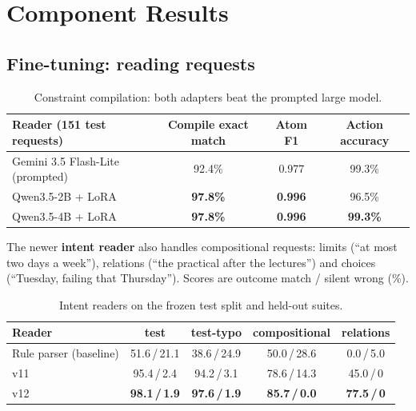 \documentclass[11pt,a4paper]{article}
\newcommand{\best}[1]{\textbf{#1}}
\begin{document}
\section{Component Results}
\subsection{Fine-tuning: reading requests}
\begin{table}[H]
\centering\small
\begin{tabularx}{\textwidth}{@{}l C C C@{}}
\toprule
\textbf{Reader (151 test requests)} & \textbf{Compile exact match} & \textbf{Atom F1} & \textbf{Action accuracy}\\
\midrule
Gemini 3.5 Flash-Lite (prompted) & 92.4\% & 0.977 & 99.3\%\\
Qwen3.5-2B + LoRA & \best{97.8\%} & \best{0.996} & 96.5\%\\
Qwen3.5-4B + LoRA & \best{97.8\%} & \best{0.996} & \best{99.3\%}\\
\bottomrule
\end{tabularx}
\caption{Constraint compilation: both adapters beat the prompted large model.}
\label{tab:parse}
\end{table}

\noindent The newer \textbf{intent reader} also handles compositional requests: limits
(``at most two days a week''), relations (``the practical after the lectures'') and
choices (``Tuesday, failing that Thursday''). Scores are outcome match / silent wrong (\%).
\begin{table}[H]
\centering\small
\begin{tabular*}{\textwidth}{@{\extracolsep{\fill}}lcccc@{}}
\toprule
\textbf{Reader} & \textbf{test} & \textbf{test-typo} & \textbf{compositional} & \textbf{relations}\\
\midrule
Rule parser (baseline) & 51.6\,/\,21.1 & 38.6\,/\,24.9 & 50.0\,/\,28.6 & 0.0\,/\,5.0\\
v11 & 95.4\,/\,2.4 & 94.2\,/\,3.1 & 78.6\,/\,14.3 & 45.0\,/\,0\\
v12 & \best{98.1\,/\,1.9} & \best{97.6\,/\,1.9} & \best{85.7\,/\,0.0} & \best{77.5\,/\,0}\\
\bottomrule
\end{tabular*}
\caption{Intent readers on the frozen test split and held-out suites.}
\end{table}
\end{document}

